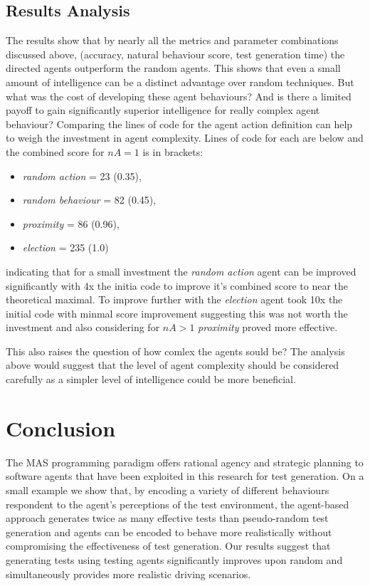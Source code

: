 \documentclass[letterpaper, 10 pt, journal, twoside]{IEEEtran}
\begin{document}
\subsection{Results Analysis}
The results show that by nearly all the metrics and parameter combinations discussed above, (accuracy, natural behaviour score, test generation time) the directed agents outperform the random agents. This shows that even a small amount of intelligence can be a distinct advantage over random techniques. 
%
But what was the cost of developing these agent behaviours?
And is there a limited payoff to gain significantly superior intelligence for really complex agent behaviour? %
%
Comparing the lines of code for the agent action definition can help to weigh the investment in agent complexity. Lines of code for each are below and the combined score for $nA=1$ is in brackets:
\begin{itemize}
  \item \textit{random action} = 23 (0.35),
  \item \textit{random behaviour} = 82 (0.45),
  \item \textit{proximity} = 86 (0.96),
  \item \textit{election} = 235 (1.0) 
\end{itemize}
indicating that for a small investment the \textit{random action} agent can be improved significantly with 4x the initia code to improve it's combined score to near the theoretical maximal. To improve further with the \textit{election} agent took 10x the initial code with minmal score improvement suggesting this was not worth the investment and also considering for $nA>1$ \textit{proximity} proved more effective.

This also raises the question of how comlex the agents sould be? The analysis above would suggest that the level of agent complexity should be considered carefully as a simpler level of intelligence could be more beneficial. %




\section{Conclusion}
The MAS programming paradigm offers rational agency and strategic planning to software agents that have been exploited in this research for test generation. 
%
On a small example we show that, by encoding a variety of different behaviours respondent to the agent's perceptions of the test environment, the agent-based approach generates twice as many effective tests than pseudo-random test generation and agents can be encoded to behave more realistically without compromising the effectiveness of test generation. %
Our results suggest that generating tests using testing agents significantly improves upon random and simultaneously provides more realistic driving scenarios.
\end{document}
